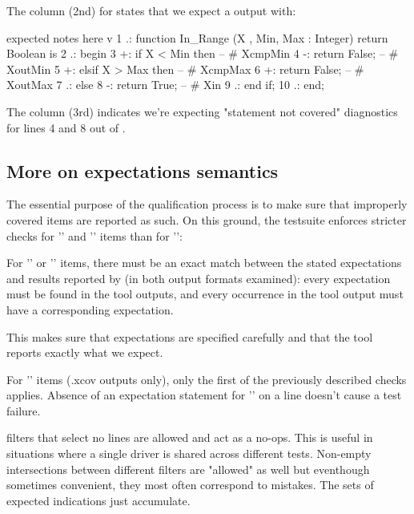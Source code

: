 \documentclass {report}
\begin{document}
The  column (2nd) for  states
that we expect a  output with:

\begin{Text}
      expected notes here
        v
      1 .: function In_Range (X , Min, Max : Integer) return Boolean is
      2 .: begin
      3 +:    if X < Min then     -- # XcmpMin
      4 -:       return False;    -- # XoutMin
      5 +:    elsif X > Max then  -- # XcmpMax
      6 +:       return False;    -- # XoutMax
      7 .:    else
      8 -:       return True;     -- # Xin
      9 .:    end if;
     10 .: end;
\end{Text}

The  column (3rd) indicates we're expecting
"statement not covered" diagnostics for lines 4 and 8 out of .

\subsection {More on expectations semantics}

The essential purpose of the qualification process is to make sure that
improperly covered items are reported as such.
%
On this ground, the testsuite enforces stricter checks for '\T{!}' and
'\T{-}' items than for '\T{+}':

\begin{Itemize}
\item%
  For '\T{-}' or '\T{!}' items, there must be an exact match between the
  stated expectations and results reported by \xcov{} (in both output formats
  examined):
  every expectation must be found in the tool outputs, and every occurrence
  in the tool output must have a corresponding expectation.

  This makes sure that expectations are specified carefully and that the
  tool reports exactly what we expect.
%
\item%
  For '\T{+}' items (.xcov outputs only), only the first of the previously
  described checks applies. Absence of an expectation statement for '\T{+}' on
  a line doesn't cause a test failure.
\end{Itemize}

 filters that select no lines are allowed and act as a
no-ops. This is useful in situations where a single driver is shared across
different tests.
%
Non-empty intersections between different filters are "allowed" as well but
eventhough sometimes convenient, they most often correspond to mistakes.
%
The sets of expected indications just accumulate.
\end{document}
